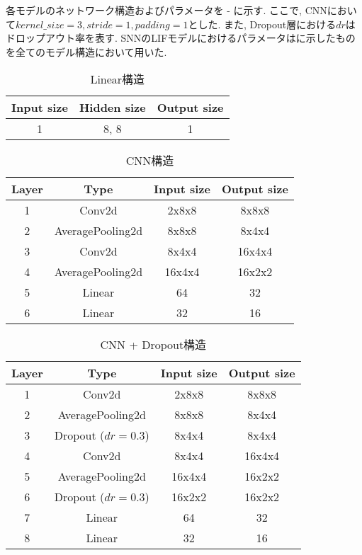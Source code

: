 各モデルのネットワーク構造およびパラメータを - に示す.
ここで, CNNにおいて$kernel\_size=3, stride=1, padding=1$とした.
また, Dropout層における$dr$はドロップアウト率を表す.
SNNのLIFモデルにおけるパラメータはに示したものを全てのモデル構造において用いた.
\begin{table}[htbp]
    \centering
    \caption{Linear構造}
    \label{tab:model:parameter:linear}
    \begin{tabular}{ccc}
        \hline
        \textbf{Input size}& \textbf{Hidden size} & \textbf{Output size}\\
        \hline
        1   & 8, 8 & 1 \\
        \hline
    \end{tabular}
\end{table}

\begin{table}[htbp]
    \centering
    \caption{CNN構造}
    \label{tab:model:parameter:cnn}
    \begin{tabular}{cccc}
        \hline
        \textbf{Layer}& \textbf{Type}&\textbf{Input size} & \textbf{Output size}\\
        \hline
        1   & Conv2d & 2x8x8 & 8x8x8 \\
        2 & AveragePooling2d & 8x8x8 & 8x4x4 \\
        3 & Conv2d & 8x4x4 & 16x4x4 \\
        4 & AveragePooling2d & 16x4x4 & 16x2x2 \\
        5 & Linear & 64 & 32 \\
        6 & Linear & 32 & 16 \\
        \hline
    \end{tabular}
\end{table}

\begin{table}[htbp]
    \centering
    \caption{CNN + Dropout構造}
    \label{tab:model:parameter:cnn:dropout}
    \begin{tabular}{cccc}
        \hline
        \textbf{Layer}& \textbf{Type}&\textbf{Input size} & \textbf{Output size}\\
        \hline
        1   & Conv2d & 2x8x8 & 8x8x8 \\
        2 & AveragePooling2d & 8x8x8 & 8x4x4 \\
        3 & Dropout ($dr=0.3$) & 8x4x4 & 8x4x4 \\
        4 & Conv2d & 8x4x4 & 16x4x4 \\
        5 & AveragePooling2d & 16x4x4 & 16x2x2 \\
        6 & Dropout ($dr=0.3$) & 16x2x2 & 16x2x2 \\
        7 & Linear & 64 & 32 \\
        8 & Linear & 32 & 16 \\
        \hline
    \end{tabular}
\end{table}

